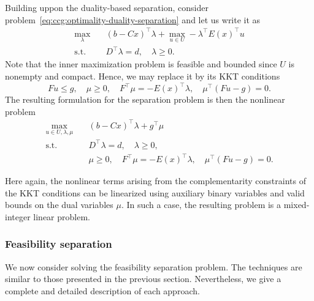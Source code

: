 Building uppon the duality-based separation, consider
problem~\eqref{eq:ccg:optimality-duality-separation} and let us write it as 
\begin{subequations}
    \begin{align*}
        \max_{\lambda} \quad & (b - Cx)^\top\lambda + 
        \max_{u\in U} -\lambda^\top E(x)^\top u \\
        \text{s.t.} \quad & D^\top \lambda = d, \quad \lambda \ge 0.
    \end{align*}
\end{subequations}
Note that the inner maximization problem is feasible and bounded since $U$ is
nonempty and compact. Hence, we may replace it by its KKT conditions
\begin{equation*}
    Fu \le g, \quad \mu \ge 0, \quad F^\top\mu = -E(x)^\top\lambda, \quad \mu^\top( Fu - g ) = 0.
\end{equation*}
The resulting formulation for the separation problem is then the nonlinear
problem
\begin{subequations}
    \begin{align*}
        \max_{u\in U,\lambda,\mu} \quad & (b - Cx)^\top\lambda + g^\top\mu \\
        \text{s.t.} \quad & D^\top \lambda = d, \quad \lambda \ge 0, \\
        & \mu \ge 0, \quad F^\top\mu = -E(x)^\top\lambda, \quad \mu^\top( Fu - g ) = 0.
    \end{align*}
\end{subequations}

Here again, the nonlinear terms arising from the complementarity constraints
of the KKT conditions can be linearized using auxiliary binary variables and
valid bounds on the dual variables $\mu$. In such a case, the resulting
problem is a mixed-integer linear problem. 

\subsubsection{Feasibility separation}

We now consider solving the feasibility separation problem. The techniques are
similar to those presented in the previous section. Nevertheless, we give a
complete and detailed description of each approach.


